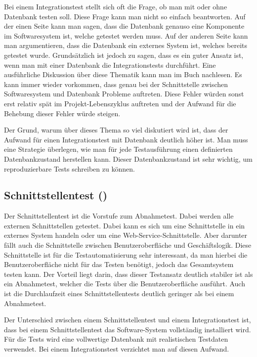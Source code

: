 \SuperPar
Bei einem Integrationstest stellt sich oft die Frage, ob man mit oder ohne Datenbank testen soll. Diese Frage kann man nicht so einfach beantworten. Auf der einen Seite kann man sagen, dass die Datenbank genauso eine Komponente im Softwaresystem ist, welche getestet werden muss. Auf der anderen Seite kann man argumentieren, dass die Datenbank ein externes System ist, welches bereits getestet wurde. Grundsätzlich ist jedoch zu sagen, dass es ein guter Ansatz ist, wenn man mit einer Datenbank die Integrationstests durchführt. Eine ausführliche Diskussion über diese Thematik kann man im Buch  \cite{intTest} nachlesen. Es kann immer wieder vorkommen, dass genau bei der Schnittstelle zwischen Softwaresystem und Datenbank Probleme auftreten. Diese Fehler würden sonst erst relativ spät im Projekt-Lebenszyklus auftreten und der Aufwand für die Behebung dieser Fehler würde steigen.

\SuperPar
Der Grund, warum über dieses Thema so viel diskutiert wird ist, dass der Aufwand für einen Integrationstest mit Datenbank deutlich höher ist. Man muss eine Strategie überlegen, wie man für jede Testausführung einen definierten Datenbankzustand herstellen kann. Dieser Datenbankzustand ist sehr wichtig, um reproduzierbare Tests schreiben zu können. 


\subsection{Schnittstellentest ()}

Der Schnittstellentest ist die Vorstufe zum Abnahmetest. Dabei werden alle externen Schnittstellen getestet. Dabei kann es sich um eine Schnittstelle in ein externes System handeln oder um eine Web-Service-Schnittstelle. Aber darunter fällt auch die Schnittstelle zwischen Benutzeroberfläche und Geschäftslogik. Diese Schnittstelle ist für die Testautomatisierung sehr interessant, da man hierbei die Benutzeroberfläche nicht für das Testen benötigt, jedoch das Gesamtsystem testen kann. Der Vorteil liegt darin, dass dieser Testansatz deutlich stabiler ist als ein Abnahmetest, welcher die Tests über die Benutzeroberfläche ausführt. Auch ist die Durchlaufzeit eines Schnittstellentests deutlich geringer als bei einem Abnahmetest.

\SuperPar
Der Unterschied zwischen einem Schnittstellentest und einem Integrationstest ist, dass bei einem Schnittstellentest das Software-System vollständig installiert wird. Für die Tests wird eine vollwertige Datenbank mit realistischen Testdaten verwendet. Bei einem Integrationstest verzichtet man auf diesen Aufwand.

